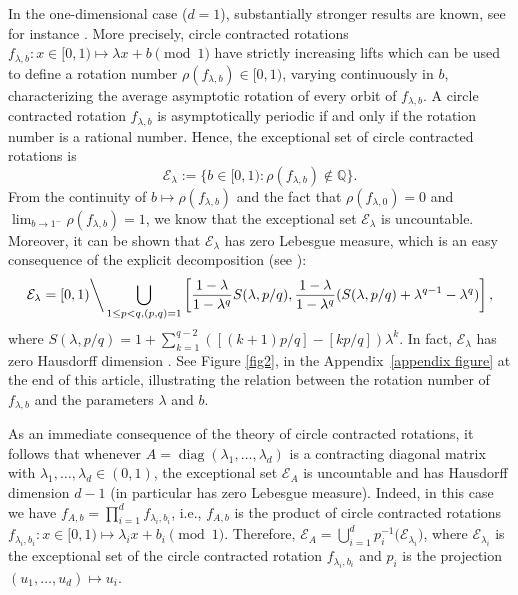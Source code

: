 \documentclass[12pt,reqno,a4paper]{amsart}%
\theoremstyle{definition}
\theoremstyle{remark}
\begin{document}
{{In the one-dimensional case ($d=1$), substantially stronger results are known, see for instance \cite{B93, B04, zbMATH01300448, MR1861988, BKLN21, Arnaud, LN18}. More precisely, circle contracted rotations $f_{\lambda,b}:x\in [0,1)\mapsto \lambda x+b\pmod{1}$ have strictly increasing lifts which can be used to define a rotation number $\rho(f_{\lambda,b})\in[0,1)$,  varying continuously in $b$,  characterizing the average asymptotic rotation of every orbit of $f_{\lambda,b}$. A circle contracted rotation $f_{\lambda,b}$ is asymptotically periodic if and only if the rotation number is a rational number. Hence, the exceptional set of circle contracted rotations is 
$$
\mathcal{E}_{\lambda} := \{b\in[0,1)\colon \rho(f_{\lambda,b})\notin \mathbb{Q}\}.
$$
From the continuity of $b\mapsto \rho(f_{\lambda,b})$ and the fact that $\rho(f_{\lambda,0})=0$ and \linebreak $\lim_{b\to 1^-} \rho(f_{\lambda,b})= 1$,  we know that the exceptional set $\mathcal{E}_{\lambda}$ is uncountable.  Moreover, it can be shown that $\mathcal{E}_{\lambda}$ has zero Lebesgue measure, which is an easy consequence of the explicit decomposition (see \cite[Theorem 1]{MR1861988}):
$$
\mathcal{E}_{\lambda} = [0,1)\bigg\backslash \bigcup_{1\leq p<q,  (p,q)=1} \left[\frac{1-\lambda}{1-\lambda^q}S(\lambda,p/q), \frac{1-\lambda}{1-\lambda^q}(S(\lambda,p/q) + \lambda^{q-1}-\lambda^q)\right],
$$
where $S(\lambda,p/q)= 1+ \sum_{k=1}^{q-2}([(k+1)p/q]-[kp/q])\lambda^k$. In fact, $\mathcal{E}_{\lambda}$ has zero Hausdorff dimension \cite[Theorem 5]{LN18}. See Figure \ref{fig2}, in the Appendix~\ref{appendix figure} at the end of this article, illustrating the relation between  the rotation number of $f_{\lambda,b}$ and the parameters $\lambda$ and $b$.  

As an immediate consequence of the theory of circle contracted rotations, it follows that whenever $A=\operatorname{diag}(\lambda_1,\ldots,\lambda_d)$
is a contracting diagonal matrix with $\lambda_1,\ldots,\lambda_d\in(0,1)$, the exceptional set $\mathcal E_A$ is uncountable and has Hausdorff dimension $d-1$ (in particular has zero Lebesgue measure). Indeed, in this case we have $f_{A,b}=\prod_{i=1}^d f_{\lambda_i,b_i}$, i.e., $f_{A,b}$ is the product of  circle contracted rotations $f_{\lambda_i,b_i}:x\in [0,1)\mapsto \lambda_i x+b_i\pmod{1}$. Therefore,  $\mathcal{E}_A =\bigcup_{i=1}^d p_i^{-1}\big(\mathcal{E}_{\lambda_i}\big)$,  where $\mathcal{E}_{\lambda_i}$ is the exceptional set of the circle contracted rotation $f_{\lambda_i,b_i}$ and $p_i$ is the projection $(u_1,\ldots,u_d)\mapsto u_i$. 


}}
\end{document}
